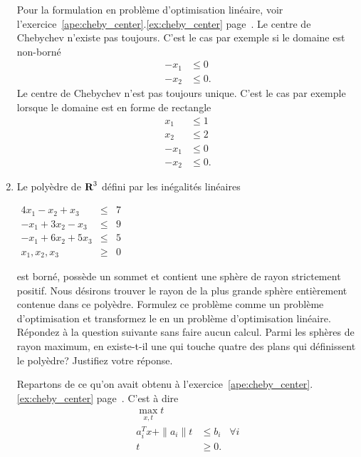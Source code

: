 \begin{enumerate}
    \begin{solution}
      Pour la formulation en problème d'optimisation linéaire,
      voir l'exercice~\ref{ape:cheby_center}.\ref{ex:cheby_center}
      page~\pageref{ex:cheby_center}.
      Le centre de Chebychev n'existe pas toujours.
      C'est le cas par exemple si le domaine est non-borné
      \begin{align*}
        -x_1 & \leq 0\\
        -x_2 & \leq 0.
      \end{align*}
      Le centre de Chebychev n'est pas toujours unique.
      C'est le cas par exemple lorsque le domaine est en forme de rectangle
      \begin{align*}
        x_1 & \leq 1\\
        x_2 & \leq 2\\
        -x_1 & \leq 0\\
        -x_2 & \leq 0.
      \end{align*}
    \end{solution}

  \item  Le poly\`edre de ${\mbox{\bf R}}^3$ défini par les inégalités linéaires

    $
    \begin{array}{rcr}
      4x_1- x_2 +x_3 & \leq & 7\\
      -x_1 +3x_2 -x_3 & \leq & 9\\
      -x_1 + 6 x_2 +5 x_3 & \leq & 5\\
      x_1, x_2, x_3 & \geq & 0
    \end{array}
    $

    est borné, possède un sommet et contient une sphère de rayon strictement positif. Nous désirons trouver le rayon de la plus grande
    sphère entièrement contenue dans ce poly\`edre. Formulez ce problème comme un problème d'optimisation et transformez le en un
    problème d'optimisation linéaire.  Répondez à la question suivante sans faire aucun calcul. Parmi les sphères de rayon
    maximum, en existe-t-il une qui touche quatre des plans qui définissent le poly\`edre? Justifiez votre réponse.



    \begin{solution}
      Repartons de ce qu'on avait obtenu à
      l'exercice~\ref{ape:cheby_center}.\ref{ex:cheby_center}
      page~\pageref{ex:cheby_center}.
      C'est à dire
      \begin{align*}
        \max_{x, t} t\\
        a_i^Tx + \|a_i\|t & \leq b_i & \forall i\\
        t & \geq 0.
      \end{align*}


\end{solution}
\end{enumerate}
